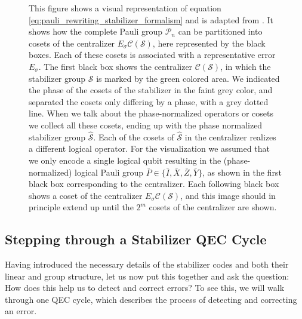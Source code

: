 \begin{figure}[ht]
    \centering
    
    \caption{
        This figure shows a visual representation of equation \eqref{eq:pauli_rewriting_stabilizer_formalism} and is adapted from \cite{gottesmann_book}.
        It shows how the complete Pauli group $\mathcal{P}_n$ can be partitioned into cosets of the centralizer $E_\sigma\mathcal{C}(\mathcal{S})$, here represented by the black boxes. 
        Each of these cosets is associated with a representative error $E_\sigma$.
        The first black box shows the centralizer $\mathcal{C}(\mathcal{S})$, in which the stabilizer group $\mathcal{S}$ is marked by the green colored area.
        We indicated the phase of the cosets of the stabilizer in the faint grey color, and separated the cosets only differing by a phase, 
        with a grey dotted line. 
        When we talk about the phase-normalized operators or cosets we collect all these cosets, ending up with the phase normalized stabilizer group $\hat{\mathcal{S}}$. 
        Each of the cosets of $\hat{\mathcal{S}}$ in the centralizer realizes a different logical operator. 
        For the visualization we assumed that we only encode a single logical qubit resulting in the (phase-normalized) logical Pauli group $\bar{P} \in \{\bar{I},\bar{X},\bar{Z},\bar{Y}\}$, 
        as shown in the first black box corresponding to the centralizer.
        Each following black box shows a coset of the centralizer $E_\sigma\mathcal{C}(\mathcal{S})$, and this image should in principle extend up until the $2^m$ cosets of the centralizer are shown.
        }
    \label{fig:stabilizer_formalism_cosets_of_centralizer}
\end{figure}


\subsection{Stepping through a Stabilizer QEC Cycle}\label{ssec:stabilizer_summary_qec_cylce}

Having introduced the necessary details of the stabilizer codes and both their linear and group structure,
let us now put this together
and ask the question: How does this help us to detect and correct errors?
To see this, we will walk through one QEC cycle, which describes the process of detecting and correcting an error.

